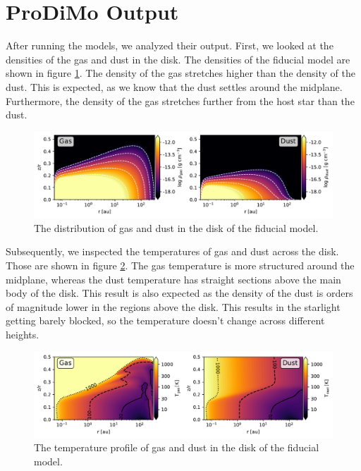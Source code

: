 \documentclass[twoside, single, authoryear, semicolon]{lion-msc}
\newcommand{\4}{$_4$}
\newcommand{\3}{$_3$}
\newcommand{\2}{$_2$}
\begin{document}
\section{ProDiMo Output}
After running the models, we analyzed their output. First, we looked at the densities of the gas and dust in the disk. The densities of the fiducial model are shown in figure \ref{fig: density}. The density of the gas stretches higher than the density of the dust. This is expected, as we know that the dust settles around the midplane. Furthermore, the density of the gas stretches further from the host star than the dust.

\begin{figure}[!ht]
    \centering
    \includegraphics[width=\linewidth]{Figures/Density.pdf}
    \caption{The distribution of gas and dust in the disk of the fiducial model.}
    \label{fig: density}
\end{figure}

Subsequently, we inspected the temperatures of gas and dust across the disk. Those are shown in figure \ref{fig: temperature}.  The gas temperature is more structured around the midplane, whereas the dust temperature has straight sections above the main body of the disk. This result is also expected as the density of the dust is orders of magnitude lower in the regions above the disk. This results in the starlight getting barely blocked, so the temperature doesn't change across different heights.

\begin{figure}[!ht]
    \centering
    \includegraphics[width=\linewidth]{Figures/Temperature.pdf}
    \caption{The temperature profile of gas and dust in the disk of the fiducial model.}
    \label{fig: temperature}
\end{figure}
\end{document}

